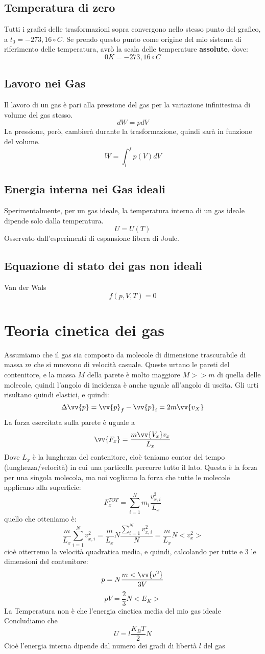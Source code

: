 \documentclass[a4paper]{report}
\begin{document}
  \subsection{Temperatura di zero}
  Tutti i grafici delle trasformazioni sopra convergono nello stesso punto del grafico, a $t_0 = -273,16\circ C$. Se prendo questo punto come origine del mio sistema di riferimento delle temperatura, avrò la scala delle temperature \textbf{assolute}, dove:
  $$0 K = -273,16 \circ C$$


  \subsection{Lavoro nei Gas}
  Il lavoro di un gas è pari alla pressione del gas per la variazione infinitesima di volume del gas stesso.
  $$ dW = p dV$$
  La pressione, però, cambierà durante la trasformazione, quindi sarà in funzione del volume.
  $$ W = \int_i^f p(V)dV $$
  \subsection{Energia interna nei Gas ideali}
  Sperimentalmente, per  un gas ideale, la temperatura interna di un gas ideale dipende solo dalla temperatura.
  $$ U = U(T) $$
  Osservato dall'esperimenti di espansione libera di Joule.
  \subsection{Equazione di stato dei gas non ideali}
  Van der Wals
  $$ f(p,V,T) = 0 $$

  \section{Teoria cinetica dei gas}
  Assumiamo che il gas sia composto da molecole di dimensione trascurabile di massa $m$ che si muovono di velocità casuale. Queste urtano le pareti del contenitore, e la massa $M$ della parete è molto maggiore $M>>m$ di quella delle molecole, quindi l'angolo di incidenza è anche uguale all'angolo di uscita. Gli urti risultano quindi elastici, e quindi:
  $$ \Delta \vv{p} = \vv{p}_f - \vv{p}_i = 2 m\vv{v_X}$$
  La forza esercitata sulla parete è uguale a
  $$ \vv{F_x} = \frac{m \vv{V_x} v_x}{L_x}$$
  Dove $L_x$ è la lunghezza del contenitore, cioè teniamo contor del tempo (lunghezza/velocità) in cui una particella percorre tutto il lato. Questa è la forza per una singola molecola, ma noi vogliamo la forza che tutte le molecole applicano alla superficie:
  $$ F_x^{TOT} = \sum_{i=1}^N m_i \frac{v_{x,i}^2}{L_x}$$
  quello che otteniamo è:
  $$\frac{m}{L_x} \sum_{i=1}^N v_{x,i}^2 = \frac{m}{L_x} N \frac{\sum_{i=1}^N v_{x,i}^2}{N} = \frac{m}{L_x}N <v_x^2>$$
  cioè otterremo la velocità quadratica media, e quindi, calcolando per tutte e 3 le dimensioni del contenitore:
  $$p = N \frac{m <\vv{v^2}}{3V}$$
  $$pV = \frac{2}{3} N <E_K>$$
  La Temperatura non è che l'energia cinetica media del mio gas ideale
  Concludiamo che
  $$ U = l \frac{K_B T}{2} N$$
  Cioè l'energia interna dipende dal numero dei gradi di libertà $l$ del gas
\end{document}
